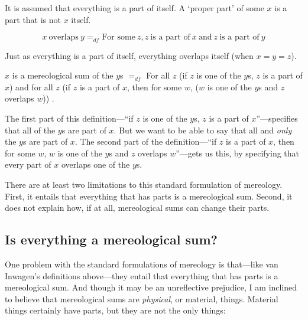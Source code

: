 \documentclass[11pt]{article}
\newenvironment{squote}{%
\begin{spacing}{1}
\begin{list}{}{%
\setlength{\labelwidth}{0pt}%
\rightmargin\leftmargin%
}
\item\relax
}{%
\end{list}%
\end{spacing}
}
\begin{document}
\begin{spacing}{1.5}
It is assumed that everything is a part of itself.  A `proper part' of
some $x$ is a part that is not $x$ itself.

\begin{displaymath}
x\ \text{overlaps}\ y =_{df} \text{For some}\ z, z\ \text{is a part
  of}\ x\ \text{and}\ z\ \text{is a part of}\ y
\end{displaymath}

Just as everything is a part of itself, everything overlaps itself
(when $x = y = z$).

\begin{squote}
$x$ is a mereological sum of the $y$s $=_{df}$ For all $z$ (if $z$ is
  one of the $y$s, $z$ is a part of $x$) and for all $z$ (if $z$ is a
  part of $x$, then for some $w$, ($w$ is one of the $y$s and $z$
  overlaps $w$)) \citeyearpar[618--619]{inwagen2006}.
\end{squote}

The first part of this definition---``if $z$ is one of the $y$s, $z$
is a part of $x$''---specifies that all of the $y$s are part of $x$.
But we want to be able to say that all and {\em only} the $y$s are
part of $x$.  The second part of the definition---``if $z$ is a part
of $x$, then for some $w$, $w$ is one of the $y$s and $z$ overlaps
$w$''---gets us this, by specifying that every part of $x$ overlaps
one of the $y$s.


There are at least two limitations to this standard formulation of
mereology.  First, it entails that everything that has parts is a
mereological sum.  Second, it does not explain how, if at all,
mereological sums can change their parts.

\subsection{Is everything a mereological sum?}
\label{all-sum}
One problem with the standard formulations of mereology is that---like
van Inwagen's definitions above---they entail that everything that has
parts is a mereological sum.  And though it may be an unreflective
prejudice, I am inclined to believe that mereological sums are {\em
  physical}, or material, things.  Material things certainly have
parts, but they are not the only things:


\end{spacing}
\end{document}
